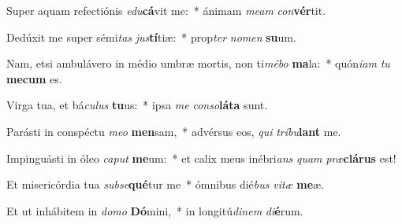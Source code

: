 \item Super aquam refectiónis \textit{e}\textit{du}\textbf{cá}vit me:~* ánimam \textit{me}\textit{am} \textit{con}\textbf{vér}tit.
\item Dedúxit me super sémi\textit{tas} \textit{jus}\textbf{tí}tiæ:~* prop\textit{ter} \textit{no}\textit{men} \textbf{su}um.
\item Nam, etsi ambulávero in médio umbræ mortis, non ti\textit{mé}\textit{bo} \textbf{ma}la:~* quón\textit{i}\textit{am} \textit{tu} \textbf{me}\textbf{cum} es.
\item Virga tua, et bá\textit{cu}\textit{lus} \textbf{tu}us:~* ipsa \textit{me} \textit{con}\textit{so}\textbf{lá}\textbf{ta} sunt.
\item Parásti in conspéctu \textit{me}\textit{o} \textbf{men}sam,~* advérsus eos, \textit{qui} \textit{trí}\textit{bu}\textbf{lant} me.
\item Impinguásti in óleo \textit{ca}\textit{put} \textbf{me}um:~* et calix meus inébri\textit{ans} \textit{quam} \textit{præ}\textbf{clá}\textbf{rus} est!
\item Et misericórdia tua \textit{sub}\textit{se}\textbf{qué}tur me~* ómnibus dié\textit{bus} \textit{vi}\textit{tæ} \textbf{me}æ.
\item Et ut inhábitem in \textit{do}\textit{mo} \textbf{Dó}mini,~* in longitú\textit{di}\textit{nem} \textit{di}\textbf{é}rum.
